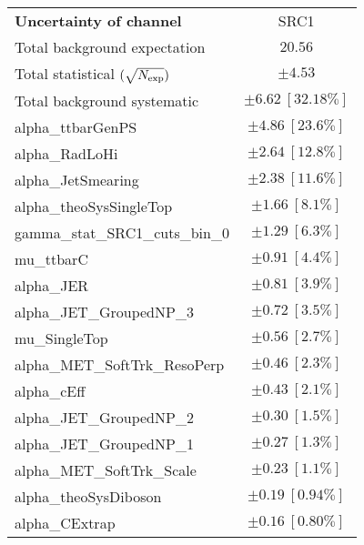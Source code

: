 
\begin{table}
\begin{center}
\setlength{\tabcolsep}{0.0pc}
\begin{tabular*}{\textwidth}{@{\extracolsep{\fill}}lc}
\noalign{\smallskip}\hline\noalign{\smallskip}
{\bf Uncertainty of channel}                                    & SRC1            \\
\noalign{\smallskip}\hline\noalign{\smallskip}
Total background expectation             &  $20.56$       \\
\noalign{\smallskip}\hline\noalign{\smallskip}
Total statistical $(\sqrt{N_{\rm exp}})$              & $\pm 4.53$       \\
Total background systematic               & $\pm 6.62\ [32.18\%] $             \\
\noalign{\smallskip}\hline\noalign{\smallskip}
\noalign{\smallskip}\hline\noalign{\smallskip}
alpha\_ttbarGenPS         & $\pm 4.86\ [23.6\%] $       \\
alpha\_RadLoHi         & $\pm 2.64\ [12.8\%] $       \\
alpha\_JetSmearing         & $\pm 2.38\ [11.6\%] $       \\
alpha\_theoSysSingleTop         & $\pm 1.66\ [8.1\%] $       \\
gamma\_stat\_SRC1\_cuts\_bin\_0         & $\pm 1.29\ [6.3\%] $       \\
mu\_ttbarC         & $\pm 0.91\ [4.4\%] $       \\
alpha\_JER         & $\pm 0.81\ [3.9\%] $       \\
alpha\_JET\_GroupedNP\_3         & $\pm 0.72\ [3.5\%] $       \\
mu\_SingleTop         & $\pm 0.56\ [2.7\%] $       \\
alpha\_MET\_SoftTrk\_ResoPerp         & $\pm 0.46\ [2.3\%] $       \\
alpha\_cEff         & $\pm 0.43\ [2.1\%] $       \\
alpha\_JET\_GroupedNP\_2         & $\pm 0.30\ [1.5\%] $       \\
alpha\_JET\_GroupedNP\_1         & $\pm 0.27\ [1.3\%] $       \\
alpha\_MET\_SoftTrk\_Scale         & $\pm 0.23\ [1.1\%] $       \\
alpha\_theoSysDiboson         & $\pm 0.19\ [0.94\%] $       \\
alpha\_CExtrap         & $\pm 0.16\ [0.80\%] $       \\

\end{tabular*}
\end{center}
\end{table}
